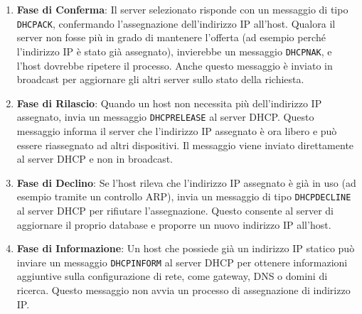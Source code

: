 \documentclass[12pt]{report}
\begin{document}
\begin{enumerate}
    \item \textbf{Fase di Conferma}:  
    Il server selezionato risponde con un messaggio di tipo \texttt{DHCPACK}, confermando l'assegnazione dell'indirizzo IP all'host. Qualora il server non fosse più in grado di mantenere l'offerta (ad esempio perché l'indirizzo IP è stato già assegnato), invierebbe un messaggio \texttt{DHCPNAK}, e l'host dovrebbe ripetere il processo. Anche questo messaggio è inviato in broadcast per aggiornare gli altri server sullo stato della richiesta.
    \item \textbf{Fase di Rilascio}:  
    Quando un host non necessita più dell'indirizzo IP assegnato, invia un messaggio \texttt{DHCPRELEASE} al server DHCP. Questo messaggio informa il server che l'indirizzo IP assegnato è ora libero e può essere riassegnato ad altri dispositivi. Il messaggio viene inviato direttamente al server DHCP e non in broadcast.
    \item \textbf{Fase di Declino}:  
    Se l'host rileva che l'indirizzo IP assegnato è già in uso (ad esempio tramite un controllo ARP), invia un messaggio di tipo \texttt{DHCPDECLINE} al server DHCP per rifiutare l'assegnazione. Questo consente al server di aggiornare il proprio database e proporre un nuovo indirizzo IP all'host.
    \item \textbf{Fase di Informazione}:  
    Un host che possiede già un indirizzo IP statico può inviare un messaggio \texttt{DHCPINFORM} al server DHCP per ottenere informazioni aggiuntive sulla configurazione di rete, come gateway, DNS o domini di ricerca. Questo messaggio non avvia un processo di assegnazione di indirizzo IP.
\end{enumerate}
\end{document}
